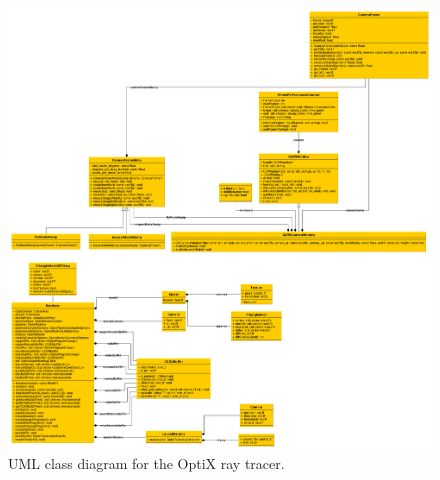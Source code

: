 \begin{figure}[hbt!]
  \centering
  \includegraphics[width=\textwidth]{figuras/optix-uml.png}
  \caption{UML class diagram for the OptiX ray tracer.}
  \label{optix-uml}

\end{figure}
